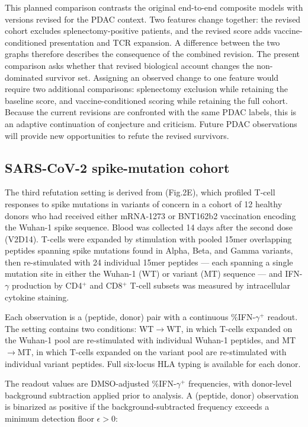 \documentclass[11pt]{article}
\begin{document}
This planned comparison contrasts the original end-to-end composite models
with versions revised for the PDAC context. Two features change together:
the revised cohort excludes splenectomy-positive patients, and the revised
score adds vaccine-conditioned presentation and TCR expansion. A difference
between the two graphs therefore describes the consequence of the combined
revision. The present comparison asks whether that revised biological account
changes the non-dominated survivor set. Assigning an observed change to one
feature would require two additional comparisons: splenectomy exclusion while
retaining the baseline score, and vaccine-conditioned scoring while retaining
the full cohort. Because the current revisions are confronted with the same
PDAC labels, this is an adaptive continuation of conjecture and criticism.
Future PDAC observations will provide new opportunities to refute the revised
survivors.

\subsection{SARS-CoV-2 spike-mutation cohort}

The third refutation setting is derived from \citet{cimenbozkus2025} (Fig.2E), which profiled T-cell
responses to spike mutations in variants of concern in a cohort of 12 healthy donors
who had received either mRNA-1273 or BNT162b2 vaccination encoding the Wuhan-1 spike
sequence. Blood was collected 14 days after the second dose (V2D14). T-cells were
expanded by stimulation with pooled 15mer overlapping peptides spanning spike mutations
found in Alpha, Beta, and Gamma variants, then re-stimulated with 24 individual 15mer
peptides --- each spanning a single mutation site in either the Wuhan-1 (WT) or variant
(MT) sequence --- and IFN-$\gamma$ production by CD4$^+$ and CD8$^+$ T-cell subsets
was measured by intracellular cytokine staining.

Each observation is a (peptide, donor) pair with a continuous \%IFN-$\gamma^+$ readout.
The setting contains two conditions: WT$\to$WT, in which T-cells expanded on the
Wuhan-1 pool are re-stimulated with individual Wuhan-1 peptides, and MT$\to$MT, in
which T-cells expanded on the variant pool are re-stimulated with individual variant
peptides. Full six-locus HLA typing is available for each donor.

The readout values are DMSO-adjusted \%IFN-$\gamma^+$ frequencies,
with donor-level background subtraction applied prior to analysis.
A (peptide, donor) observation is binarized as positive if the
background-subtracted frequency exceeds a minimum detection floor
$\epsilon > 0$:
\end{document}
